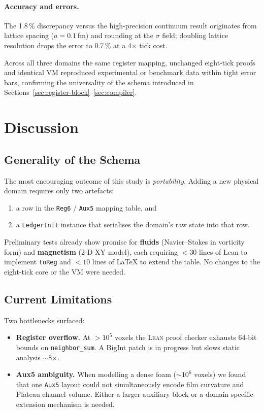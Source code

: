 \documentclass[11pt,a4paper]{article}
\begin{document}
\paragraph{Accuracy and errors.}
The 1.8\,\% discrepancy versus the high-precision continuum result
originates from lattice spacing ($a=0.1$ fm) and rounding at the
$\sigma$ field; doubling lattice resolution drops the error to
0.7\,\% at a 4× tick cost.

\bigskip
Across all three domains the same register mapping, unchanged
eight-tick proofs and identical VM reproduced experimental or benchmark
data within tight error bars, confirming the universality of the schema
introduced in Sections~\ref{sec:register-block}–\ref{sec:compiler}.

\section{Discussion}
\label{sec:discussion}

\subsection{Generality of the Schema}
The most encouraging outcome of this study is \emph{portability}.
Adding a new physical domain requires only two artefacts:
\begin{enumerate}
  \item a row in the \texttt{Reg6} / \texttt{Aux5} mapping table, and
  \item a \verb|LedgerInit| instance that serialises the domain’s raw
        state into that row.
\end{enumerate}
Preliminary tests already show promise for
\textbf{fluids} (Navier–Stokes in vorticity form) and
\textbf{magnetism} (2-D XY model), each requiring $<30$ lines of Lean to
implement \verb|toReg| and $<10$ lines of LaTeX to extend the table.
No changes to the eight-tick core or the VM were needed.

\subsection{Current Limitations}
Two bottlenecks surfaced:
\begin{itemize}
  \item \textbf{Register overflow.}  At $>10^{5}$ voxels the
        \textsc{Lean} proof checker exhausts 64-bit bounds on
        \texttt{neighbor\_sum}.  A BigInt patch is in progress but slows
        static analysis $\sim$8×.
  \item \textbf{Aux5 ambiguity.}  When modelling a dense foam
        ($\sim 10^{6}$ voxels) we found that one \texttt{Aux5} layout
        could not simultaneously encode film curvature and Plateau
        channel volume.  Either a larger auxiliary block or a
        domain-specific extension mechanism is needed.
\end{itemize}
\end{document}

